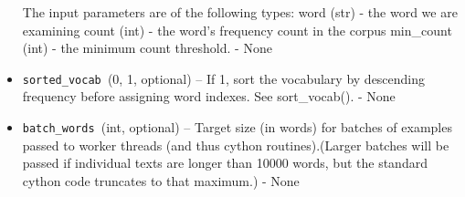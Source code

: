 \begin{itemize}
    The input parameters are of the following types:
            word (str) - the word we are examining
            count (int) - the word’s frequency count in the corpus
            min\_count (int) - the minimum count threshold. - None

  \item  \texttt{sorted\_vocab }({0, 1}, optional) – If 1, sort the vocabulary by descending frequency before assigning word indexes. See sort\_vocab(). - None
 \item   \texttt{batch\_words }(int, optional) – Target size (in words) for batches of examples passed to worker threads (and thus cython routines).(Larger batches will be passed if individual texts are longer than 10000 words, but the standard cython code truncates to that maximum.) - None 
\end{itemize}

